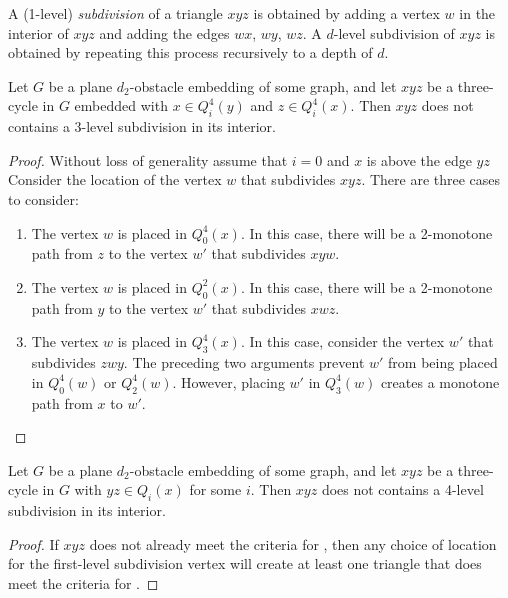 \documentclass{patmorin}
\begin{document}
A (1-level) \emph{subdivision} of a triangle $xyz$ is obtained by adding a
vertex $w$ in the interior of $xyz$ and adding the edges $wx$, $wy$, $wz$.
A $d$-level subdivision of $xyz$ is obtained by repeating this process
recursively to a depth of $d$.

\begin{lem}
   Let $G$ be a plane $d_2$-obstacle embedding of some graph, and let $xyz$
   be a three-cycle in $G$ embedded with $x\in Q^4_i(y)$ and $z\in Q^4_i(x)$.
   Then $xyz$ does not contains a 3-level subdivision in its interior.
\end{lem}

\begin{proof}
   Without loss of generality assume that $i=0$ and $x$ is above the edge
   $yz$ Consider the location of the vertex $w$ that subdivides $xyz$.
   There are three cases to consider:
   \begin{enumerate}
      \item The vertex $w$ is placed in $Q^4_0(x)$.  In this case,
        there will be a 2-monotone path from $z$ to the vertex $w'$ that
        subdivides $xyw$.
      \item The vertex $w$ is placed in $Q^2_0(x)$.  In this case,
        there will be a 2-monotone path from $y$ to the vertex $w'$ that
        subdivides $xwz$.
      \item The vertex $w$ is placed in $Q^4_3(x)$. In this case,
      consider the vertex $w'$ that subdivides $zwy$.  The preceding
      two arguments prevent $w'$ from being placed in $Q^4_0(w)$
      or $Q^4_2(w)$.  However, placing $w'$ in $Q^4_3(w)$ creates a
      monotone path from $x$ to $w'$.
   \end{enumerate} 
\end{proof}

\begin{lem}
   Let $G$ be a plane $d_2$-obstacle embedding of some graph, and let
   $xyz$ be a three-cycle in $G$ with $yz\in Q_i(x)$ for some $i$.
   Then $xyz$ does not contains a 4-level subdivision in its interior.
\end{lem}

\begin{proof}
   If $xyz$ does not already meet the criteria for , then
   any choice of location for the first-level subdivision vertex will create
   at least one triangle that does meet the criteria for .
\end{proof}
\end{document}
